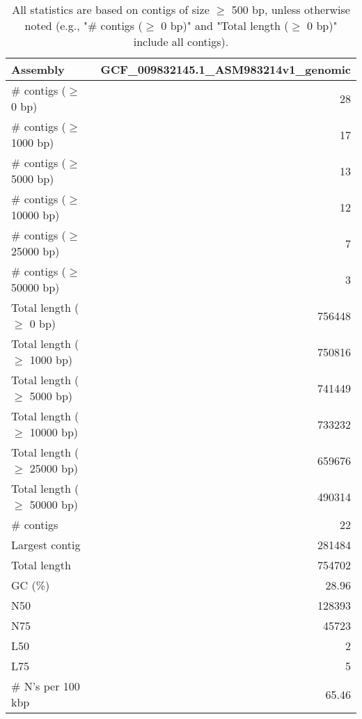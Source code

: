 \documentclass[12pt,a4paper]{article}
\begin{document}
\begin{table}[ht]
\begin{center}
\caption{All statistics are based on contigs of size $\geq$ 500 bp, unless otherwise noted (e.g., "\# contigs ($\geq$ 0 bp)" and "Total length ($\geq$ 0 bp)" include all contigs).}
\begin{tabular}{|l*{1}{|r}|}
\hline
Assembly & GCF\_009832145.1\_ASM983214v1\_genomic \\ \hline
\# contigs ($\geq$ 0 bp) & 28 \\ \hline
\# contigs ($\geq$ 1000 bp) & 17 \\ \hline
\# contigs ($\geq$ 5000 bp) & 13 \\ \hline
\# contigs ($\geq$ 10000 bp) & 12 \\ \hline
\# contigs ($\geq$ 25000 bp) & 7 \\ \hline
\# contigs ($\geq$ 50000 bp) & 3 \\ \hline
Total length ($\geq$ 0 bp) & 756448 \\ \hline
Total length ($\geq$ 1000 bp) & 750816 \\ \hline
Total length ($\geq$ 5000 bp) & 741449 \\ \hline
Total length ($\geq$ 10000 bp) & 733232 \\ \hline
Total length ($\geq$ 25000 bp) & 659676 \\ \hline
Total length ($\geq$ 50000 bp) & 490314 \\ \hline
\# contigs & 22 \\ \hline
Largest contig & 281484 \\ \hline
Total length & 754702 \\ \hline
GC (\%) & 28.96 \\ \hline
N50 & 128393 \\ \hline
N75 & 45723 \\ \hline
L50 & 2 \\ \hline
L75 & 5 \\ \hline
\# N's per 100 kbp & 65.46 \\ \hline
\end{tabular}
\end{center}
\end{table}
\end{document}

